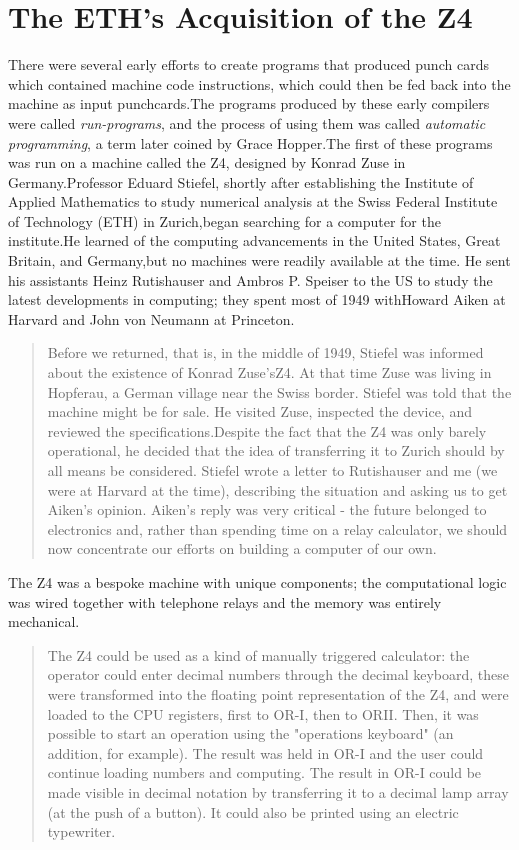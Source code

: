 \section{The ETH's Acquisition of the Z4}
There were several early efforts to create programs that produced punch
cards which contained machine code instructions, which could then be fed back
into the machine as input punchcards.The programs produced by these early
compilers were called \textit{run-programs}, and the process of using them was
called \textit{automatic programming}, a term later coined by Grace Hopper.The
first of these programs was run on a machine called the Z4, designed by Konrad
Zuse in Germany.Professor Eduard Stiefel, shortly after establishing the
Institute of Applied Mathematics to study numerical analysis at the Swiss
Federal Institute of Technology (ETH) in Zurich,began searching for a computer
for the institute.He learned of the computing advancements in the United
States, Great Britain, and Germany,but no machines were readily available at
the time. He sent his assistants Heinz Rutishauser and Ambros P. Speiser to the
US to study the latest developments in computing; they spent most of 1949
withHoward Aiken at Harvard and John von Neumann at Princeton.
\begin{quotation}
  Before we returned, that is, in the middle of 1949, Stiefel was informed
  about the existence of Konrad Zuse'sZ4. At that time Zuse was living in
  Hopferau, a German village near the Swiss border. Stiefel was told that the
  machine might be for sale. He visited Zuse, inspected the device, and reviewed
  the specifications.Despite the fact that the Z4 was only barely
  operational, he
  decided that the idea of transferring it to Zurich should by all means be
  considered. Stiefel wrote a letter to Rutishauser and me (we were at Harvard at the time), describing the situation and asking us to get Aiken's opinion.
  Aiken's reply was very critical - the future belonged to electronics
  and, rather
  than spending time on a relay calculator, we should now concentrate our efforts
  on building a computer of our own.
  \cite{konrad-zuses-z4-2000}
\end{quotation}
The Z4 was a bespoke machine with unique components; the computational logic
was wired together with telephone relays and the memory was entirely mechanical.
\begin{quotation}
  The Z4 could be used as a kind of manually triggered calculator: the
  operator could enter decimal numbers through the decimal keyboard, these
  were transformed into the floating point representation of the Z4, and were
  loaded to the CPU registers, first to OR-I, then to ORII. Then, it was possible
  to start an operation using the "operations keyboard" (an addition, for
  example). The result was held in OR-I and the user could continue loading
  numbers and computing. The result in OR-I could be made visible in decimal
  notation by transferring it to a decimal lamp array (at the push of a button).
  It could also be printed using an electric typewriter.
  \cite{architecture-of-konrad-zuses-z4-computer-2021}
\end{quotation}
